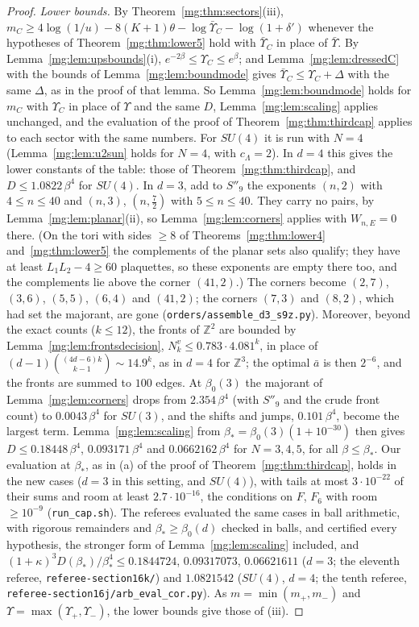 \documentclass[11pt,a4paper]{article}
\theoremstyle{definition}
\theoremstyle{remark}
\newcommand{\Z}{\mathbb{Z}}
\begin{document}
\begin{proof}
\emph{Lower bounds.} By Theorem~\ref{mg:thm:sectors}(iii), $m_C\ge4\log(1/u)-8(K+1)\theta-\log\bar\Upsilon_C-\log(1+\delta')$ whenever the hypotheses of Theorem~\ref{mg:thm:lower5} hold
with $\bar\Upsilon_C$ in place of $\bar\Upsilon$. By Lemma~\ref{mg:lem:upsbounds}(i), $e^{-2\beta}\le\Upsilon_C\le e^\beta$; and Lemma~\ref{mg:lem:dressedC} with the bounds of
Lemma~\ref{mg:lem:boundmode} gives $\bar\Upsilon_C\le\Upsilon_C+\Delta$ with the same $\Delta$, as in the proof of that lemma. So Lemma~\ref{mg:lem:boundmode} holds for $m_C$ with $\Upsilon_C$ in place of
$\Upsilon$ and the same $D$, Lemma~\ref{mg:lem:scaling} applies unchanged, and the evaluation of the proof of Theorem~\ref{mg:thm:thirdcap} applies to each sector with the same numbers. For $SU(4)$
it is run with $N=4$ (Lemma~\ref{mg:lem:u2sun} holds for $N=4$, with $c_\Lambda=2$). In $d=4$ this gives the lower constants of the table: those of Theorem~\ref{mg:thm:thirdcap}, and
$D\le1.0822\,\beta^4$ for $SU(4)$. In $d=3$, add to $S''_9$ the exponents $(n,2)$ with $4\le n\le40$ and $(n,3)$, $(n,\frac72)$ with $5\le n\le40$. They carry no pairs, by
Lemma~\ref{mg:lem:planar}(ii), so Lemma~\ref{mg:lem:corners} applies with $W_{n,E}=0$ there. (On the tori with sides $\ge8$ of Theorems~\ref{mg:thm:lower4} and~\ref{mg:thm:lower5} the complements
of the planar sets also qualify; they have at least $L_1L_2-4\ge60$ plaquettes, so these exponents are empty there too, and the complements lie above the corner $(41,2)$.) The corners become
$(2,7)$, $(3,6)$, $(5,5)$, $(6,4)$ and $(41,2)$; the corners $(7,3)$ and $(8,2)$, which had set the majorant, are gone (\texttt{orders/assemble\_d3\_s9z.py}). Moreover, beyond the exact counts ($k\le12$),
the fronts of $\Z^2$ are bounded by Lemma~\ref{mg:lem:frontsdecision}, $N^v_k\le0.783\cdot4.081^k$, in place of $(d-1)\binom{(4d-6)k}{k-1}\sim14.9^k$, as in $d=4$ for $\Z^3$; the optimal $\bar a$
is then $2^{-6}$, and the fronts are summed to $100$ edges. At $\beta_0(3)$ the majorant of Lemma~\ref{mg:lem:corners} drops from $2.354\,\beta^4$ (with $S''_9$ and the crude front count) to
$0.0043\,\beta^4$ for $SU(3)$, and the shifts and jumps, $0.101\,\beta^4$, become the largest term. Lemma~\ref{mg:lem:scaling} from $\beta_*=\beta_0(3)(1+10^{-30})$ then gives
$D\le0.18448\,\beta^4$, $0.093171\,\beta^4$ and $0.0662162\,\beta^4$ for $N=3,4,5$, for all $\beta\le\beta_*$. Our evaluation at $\beta_*$, as in (a) of the proof of Theorem~\ref{mg:thm:thirdcap},
holds in the new cases ($d=3$ in this setting, and $SU(4)$), with tails at most $3\cdot10^{-22}$ of their sums and room at least $2.7\cdot10^{-16}$, the conditions on $F$, $F_6$ with room $\ge10^{-9}$
(\texttt{run\_cap.sh}). The referees evaluated the same cases in ball arithmetic, with rigorous remainders and $\beta_*\ge\beta_0(d)$ checked in balls, and certified every hypothesis,
the stronger form of Lemma~\ref{mg:lem:scaling} included, and $(1+\kappa)^3D(\beta_*)/\beta_*^4\le 0.1844724$, $0.09317073$, $0.06621611$ ($d=3$; the eleventh referee,
\texttt{referee-section16k/}) and $1.0821542$ ($SU(4)$, $d=4$; the tenth referee, \texttt{referee-section16j/\allowbreak arb\_eval\_cor.py}). As $m=\min(m_+,m_-)$ and $\Upsilon=\max(\Upsilon_+,\Upsilon_-)$, the lower bounds give those of (iii).


\end{proof}
\end{document}
